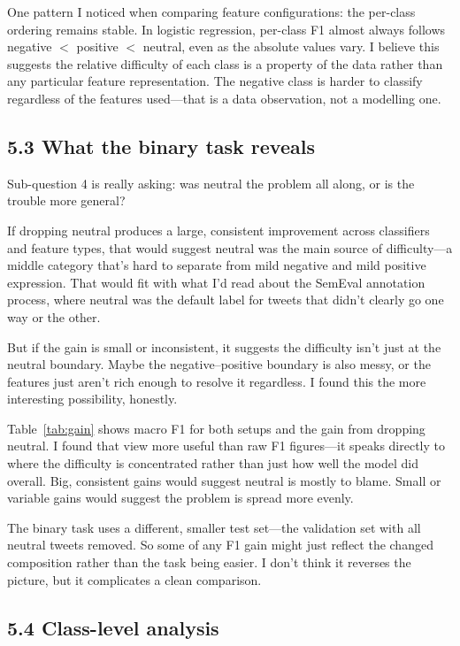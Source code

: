 \documentclass[12pt]{article}
\begin{document}
One pattern I noticed when comparing feature configurations: the per-class ordering remains  stable.
In logistic regression, per-class F1 almost always follows negative $<$ positive $<$ neutral, even as the absolute values vary.
I believe this suggests the relative difficulty of each class is a property of the data rather than any particular feature representation.
The negative class is harder to classify regardless of the features used---that is a data observation, not a modelling one.



\subsection*{5.3 What the binary task reveals}



Sub-question 4 is really asking: was neutral the problem all along, or is the trouble more general? 

If dropping neutral produces a large, consistent improvement across classifiers and feature types, that would suggest neutral was the main source of difficulty---a middle category that's  hard to separate from mild negative and mild positive expression.
That would fit with what I'd read about the SemEval annotation process, where neutral was the default label for tweets that didn't clearly go one way or the other.

But if the gain is small or inconsistent, it suggests the difficulty isn't just at the neutral boundary.
Maybe the negative--positive boundary is also messy, or the features just aren't rich enough to resolve it regardless.
I found this the more interesting possibility, honestly.

Table~\ref{tab:gain} shows macro F1 for both setups and the gain from dropping neutral.
I found that view more useful than raw F1 figures---it speaks directly to where the difficulty is concentrated rather than just how well the model did overall.
Big, consistent gains would suggest neutral is mostly to blame.
Small or variable gains would suggest the problem is spread more evenly.

The binary task uses a different, smaller test set---the validation set with all neutral tweets removed.
So some of any F1 gain might just reflect the changed composition rather than the task being easier.
I don't think it reverses the picture, but it complicates a clean comparison.



\subsection*{5.4 Class-level analysis}
\end{document}
